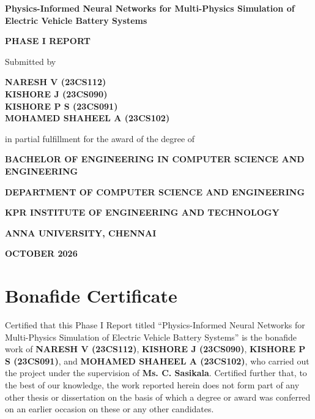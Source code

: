 \documentclass[14pt,a4paper,oneside]{extreport}
\newcommand{\projecttitle}{Physics-Informed Neural Networks for Multi-Physics Simulation of Electric Vehicle Battery Systems}
\newcommand{\degree}{Bachelor of Engineering in Computer Science and Engineering}
\begin{document}
\justifying
{}
\setcounter{page}{1}

\begin{titlepage}
\thispagestyle{empty}
\begin{center}
\vspace*{1.0cm}
{\bfseries\fontsize{18}{22}\selectfont \projecttitle\par}
\vspace{1.2cm}
{\bfseries\fontsize{16}{19}\selectfont PHASE I REPORT\par}
\vspace{1.0cm}
{\fontsize{14}{18}\selectfont Submitted by\par}
\vspace{0.5cm}
{\bfseries
NARESH V (23CS112)\\
KISHORE J (23CS090)\\
KISHORE P S (23CS091)\\
MOHAMED SHAHEEL A (23CS102)\par}
\vspace{0.9cm}
{in partial fulfillment for the award of the degree of\par}
\vspace{0.4cm}
{\bfseries\MakeUppercase{\degree}\par}
\vfill
{\bfseries DEPARTMENT OF COMPUTER SCIENCE AND ENGINEERING\par}
\vspace{0.3cm}
{\bfseries KPR INSTITUTE OF ENGINEERING AND TECHNOLOGY\par}
{\bfseries ANNA UNIVERSITY, CHENNAI\par}
\vspace{0.8cm}
{\bfseries OCTOBER 2026\par}
\end{center}
\end{titlepage}

\setcounter{page}{2}
\clearpage
\chapter*{Bonafide Certificate}
\thispagestyle{plain}
Certified that this Phase I Report titled ``\projecttitle'' is the bonafide work of \textbf{NARESH V (23CS112)}, \textbf{KISHORE J (23CS090)}, \textbf{KISHORE P S (23CS091)}, and \textbf{MOHAMED SHAHEEL A (23CS102)}, who carried out the project under the supervision of \textbf{Ms. C. Sasikala}. Certified further that, to the best of our knowledge, the work reported herein does not form part of any other thesis or dissertation on the basis of which a degree or award was conferred on an earlier occasion on these or any other candidates.
\end{document}
